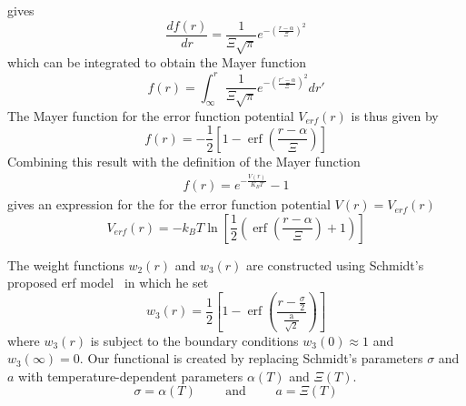 \documentclass[double,12pt]{beavtex}
\newcommand\davidsays[1]{\textcolor{red}{[\it D: #1]}}
\begin{document}
gives
\begin{equation}{\frac{df(r)}{dr}=\frac{1}{\Xi\sqrt{\pi}}e^{-\left(\frac{r-\alpha}{\Xi}\right)^2}}\end{equation} 
which can be integrated to obtain the Mayer function
\begin{equation}{f(r)=\int_{\infty}^r{ \frac{1}{\Xi\sqrt{\pi}}e^{-\left(\frac{r'-\alpha}{\Xi}\right)^2}{dr'}}}\end{equation} 
The Mayer function for the error function potential $V_{erf}(r)$ is thus 
given by
\begin{equation}{f(r)=-\frac{1}{2}\left[1-\operatorname{erf}\left(\frac{r-\alpha}{\Xi}\right)\right]}\end{equation} 
Combining this result with the definition of the Mayer function 
\begin{align}f(r)=e^{-\frac{V(r)}{K_BT}}-1\end{align} 
gives an expression for the for the error function potential  $V(r)=V_{erf}(r)$ 
\begin{equation}
	V_{erf}(r)=-k_BT\ln\left[\frac{1}{2}\left(\operatorname{erf}\left(\frac{r-\alpha}{\Xi}\right)+1\right)\right]
\end{equation}  

The weight functions $w_{2}(r)$ and $w_{3}(r)$ are constructed using 
Schmidt's proposed erf model~\cite{schmidt2000fluid} in which he set
\begin{equation}
  w_3(r)=\frac{1}{2}\left[1-\operatorname{erf}\left(\frac{r-\frac{\sigma}{2}}{\frac{\text{a}}{\sqrt{2}}}\right)\right]
\end{equation} 
where $w_3(r)$ is subject to the boundary conditions $w_3(0)\approx{1}$ 
and $w_3(\infty)=0$. 
Our functional is  created by replacing Schmidt's parameters $\sigma$ 
and $a$ with temperature-dependent parameters $\alpha(T)$ and $\Xi(T)$.
\begin{equation}\sigma = \alpha(T)\text{~~~~~~~and~~~~~~~} a = \Xi(T)\end{equation}
\end{document}
